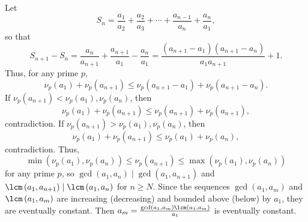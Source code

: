 Let
\[S_n=\frac{a_1}{a_2}+\frac{a_2}{a_3}+\cdots+\frac{a_{n-1}}{a_n}+\frac{a_n}{a_1},\]
so that
\[S_{n+1}-S_n=\frac{a_n}{a_{n+1}}+\frac{a_{n+1}}{a_1}-\frac{a_n}{a_1}=\frac{\left(a_{n+1}-a_1\right)\left(a_{n+1}-a_n\right)}{a_1a_{n+1}}+1.\]
Thus, for any prime $p$,
\[\nu_p\left(a_1\right)+\nu_p\left(a_{n+1}\right)\leq\nu_p\left(a_{n+1}-a_1\right)+\nu_p\left(a_{n+1}-a_n\right).\]
If $\nu_p\left(a_{n+1}\right)<\nu_p\left(a_1\right),\nu_p\left(a_n\right)$, then
\[\nu_p\left(a_1\right)+\nu_p\left(a_{n+1}\right)\leq\nu_p\left(a_{n+1}\right)+\nu_p\left(a_{n+1}\right),\]
contradiction.
If $\nu_p\left(a_{n+1}\right)>\nu_p\left(a_1\right),\nu_p\left(a_n\right)$, then
\[\nu_p\left(a_1\right)+\nu_p\left(a_{n+1}\right)\leq\nu_p\left(a_1\right)+\nu_p\left(a_n\right),\]
contradiction.
Thus,
\[\min\left(\nu_p\left(a_1\right),\nu_p\left(a_n\right)\right)\leq\nu_p\left(a_{n+1}\right)\leq\max\left(\nu_p\left(a_1\right),\nu_p\left(a_n\right)\right)\]
for any prime $p$, so $\gcd\left(a_1,a_n\right)\mid\gcd\left(a_1,a_{n+1}\right)$ and $\lcm\left(a_1,a_{n+1}\right)\mid\lcm\left(a_1,a_n\right)$ for $n\geq N$.
Since the sequences $\gcd\left(a_1,a_m\right)$ and $\lcm\left(a_1,a_m\right)$ are increasing (decreasing) and bounded above (below) by $a_1$, they are eventually constant.
Then $a_m=\frac{\gcd\left(a_1,a_m\right)\lcm\left(a_1,a_m\right)}{a_1}$ is eventually constant.
